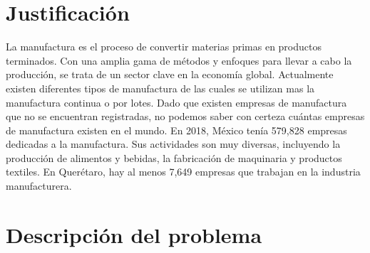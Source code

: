 \section{Justificación}

% 
% 
La manufactura es el proceso de convertir materias primas en productos terminados. Con una amplia gama de métodos y enfoques para llevar a cabo la producción, se trata de un sector clave en la economía global.
Actualmente existen diferentes tipos de manufactura de las cuales se utilizan mas la manufactura continua o por lotes. 
Dado que existen empresas de manufactura que no se encuentran registradas, no podemos saber con certeza cuántas empresas de manufactura existen en el mundo. 
En 2018, México tenía 579,828 empresas dedicadas a la manufactura. Sus actividades son muy diversas, incluyendo la producción de alimentos y bebidas, la fabricación de maquinaria y productos textiles.
En Querétaro, hay al menos 7,649 empresas que trabajan en la industria manufacturera.
% 
% 
\section{Descripción del problema}

